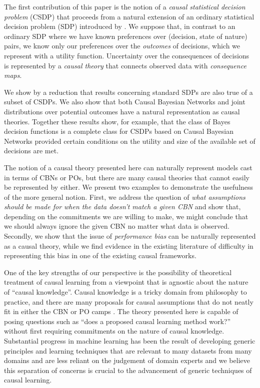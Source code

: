 The first contribution of this paper is the notion of a \emph{causal statistical decision problem} (CSDP) that proceeds from a natural extension of an ordinary statistical decision problem (SDP) introduced by \citep{wald_statistical_1950}. We suppose that, in contrast to an ordinary SDP where we have known preferences over (decision, state of nature) pairs, we know only our preferences over the \emph{outcomes} of decisions, which we represent with a utility function. Uncertainty over the consequences of decisions is represented by a \emph{causal theory} that connects observed data with \emph{consequence maps}. 

We show by a reduction that results concerning standard SDPs are also true of a subset of CSDPs.  We also show that both Causal Bayesian Networks and joint distributions over potential outcomes have a natural representation as causal theories. Together these results show, for example, that the class of Bayes decision functions is a complete class for CSDPs based on Causal Bayesian Networks provided certain conditions on the utility and size of the available set of decisions are met.

The notion of a causal theory presented here can naturally represent models cast in terms of CBNs or POs, but there are many causal theories that cannot easily be represented by either. We present two examples to demonstrate the usefulness of the more general notion. First, we address the question of \emph{what assumptions should be made for when the data doesn't match a given CBN} and show that, depending on the commitments we are willing to make, we might conclude that we should always ignore the given CBN no matter what data is observed. Secondly, we show that the issue of \emph{performance bias} can be naturally represented as a causal theory, while we find evidence in the existing literature of difficulty in representing this bias in one of the existing causal frameworks.

One of the key strengths of our perspective is the possibility of theoretical treatment of causal learning from a viewpoint that is agnostic about the nature of ``causal knowledge''. Causal knowledge is a tricky domain from philosophy to practice, and there are many proposals for causal assumptions that do not neatly fit in either the CBN or PO camps \citep{bongers_theoretical_2016,dawid_beware_2010,bengio_meta-transfer_2019}. The theory presented here is capable of posing questions such as ``does a proposed causal learning method work?'' without first requiring commitments on the nature of causal knowledge. Substantial progress in machine learning has been the result of developing generic principles and learning techniques that are relevant to many datasets from many domains and are less reliant on the judgement of domain experts and we believe this separation of concerns is crucial to the advancement of generic techniques of causal learning.

